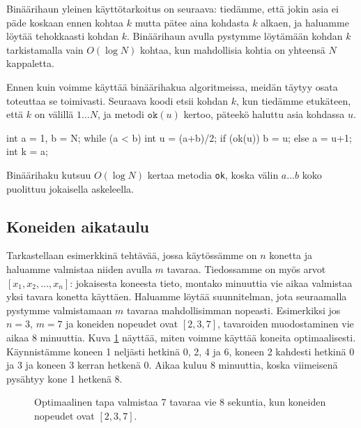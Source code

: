 Binäärihaun yleinen käyttötarkoitus on seuraava:
tiedämme, että jokin asia ei päde koskaan ennen kohtaa $k$
mutta pätee aina kohdasta $k$ alkaen,
ja haluamme löytää tehokkaasti kohdan $k$.
Binäärihaun avulla pystymme löytämään kohdan $k$
tarkistamalla vain $O(\log N)$ kohtaa,
kun mahdollisia kohtia on yhteensä $N$ kappaletta.

Ennen kuin voimme käyttää binäärihakua algoritmeissa,
meidän täytyy osata toteuttaa se toimivasti.
Seuraava koodi etsii kohdan $k$,
kun tiedämme etukäteen, että $k$ on välillä $1 \dots N$,
ja metodi $\texttt{ok}(u)$ kertoo, päteekö haluttu asia
kohdassa $u$.

\begin{code}
int a = 1, b = N;
while (a < b) {
    int u = (a+b)/2;
    if (ok(u)) b = u;
    else a = u+1;
}
int k = a;
\end{code}

Binäärihaku kutsuu $O(\log N)$ kertaa metodia \texttt{ok},
koska välin $a \dots b$ koko puolittuu jokaisella askeleella.

\subsection{Koneiden aikataulu}

Tarkastellaan esimerkkinä tehtävää, jossa käytössämme on $n$ konetta
ja haluamme valmistaa niiden avulla $m$ tavaraa.
Tiedossamme on myös arvot $[x_1,x_2,\dots,x_n]$:
jokaisesta koneesta tieto, montako minuuttia vie aikaa valmistaa
yksi tavara konetta käyttäen.
Haluamme löytää suunnitelman, jota seuraamalla pystymme valmistamaan
$m$ tavaraa mahdollisimman nopeasti.
Esimerkiksi jos $n=3$, $m=7$ ja koneiden nopeudet ovat $[2,3,7]$,
tavaroiden muodostaminen vie aikaa $8$ minuuttia.
Kuva \ref{fig:optkon} näyttää, miten voimme käyttää koneita optimaalisesti.
Käynnistämme koneen 1 neljästi hetkinä 0, 2, 4 ja 6,
koneen 2 kahdesti hetkinä 0 ja 3
ja koneen 3 kerran hetkenä 0.
Aikaa kuluu $8$ minuuttia, koska viimeisenä pysähtyy kone 1 hetkenä 8.

\begin{figure}
\center
{}
\caption{Optimaalinen tapa valmistaa 7 tavaraa vie 8 sekuntia,
kun koneiden nopeudet ovat $[2,3,7]$.}
\label{fig:optkon}
\end{figure}

